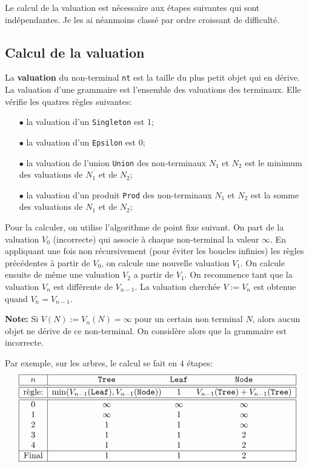 \documentclass[11pt]{article}
\renewcommand{\emph}[1]{\textbf{#1}}
\begin{document}
Le calcul de la valuation est nécessaire aux étapes suivantes qui sont
indépendantes. Je les ai néanmoins classé par ordre croissant de difficulté.

\subsection{Calcul de la valuation}

La \emph{valuation} du non-terminal \texttt{nt} est la taille du plus petit
objet qui en dérive. La valuation d'une grammaire est l'ensemble des
valuations des terminaux. Elle vérifie les quatres règles suivantes:
\begin{itemize}
\item[$\bullet$] la valuation d'un \texttt{Singleton} est 1;
\item[$\bullet$] la valuation d'un \texttt{Epsilon} est 0;
\item[$\bullet$] la valuation de l'union \texttt{Union} des non-terminaux
  $N_1$ et $N_2$ est le minimum des valuations de $N_1$ et de $N_2$;
\item[$\bullet$] la valuation d'un produit \texttt{Prod} des non-terminaux $N_1$
  et $N_2$ est la somme des valuations de $N_1$ et de $N_2$;
\end{itemize}

Pour la calculer, on utilise l'algorithme de point fixe suivant. On part de la
valuation $V_0$ (incorrecte) qui associe à chaque non-terminal la valeur
$\infty$. En appliquant une fois non récursivement (pour éviter les boucles
infinies) les règles précédentes à partir de $V_0$, on calcule une nouvelle
valuation $V_1$.  On calcule ensuite de même une valuation $V_2$ a partir de
$V_1$. On recommence tant que la valuation $V_n$ est différente de
$V_{n-1}$. La valuation cherchée $V := V_n$ est obtenue quand $V_n=V_{n-1}$.
\bigskip

\noindent\textbf{Note:} Si $V(N) := V_n(N) = \infty$ pour un certain non terminal
$N$, alors aucun objet ne dérive de ce non-terminal. On considère alors que la
grammaire est incorrecte.  \bigskip

Par exemple, sur les arbres, le calcul se fait en $4$ étapes:
$$\begin{array}{|c|ccc|}
\hline
  n     &  \texttt{Tree}  &  \texttt{Leaf}  &  \texttt{Node} \\
\hline\hline
  \text{règle:} & \min(V_{n-1}(\texttt{Leaf}),V_{n-1}(\texttt{Node}))
               & 1
               & V_{n-1}(\texttt{Tree}) + V_{n-1}(\texttt{Tree}) \\
\hline\hline
  0     &  \infty         &  \infty         &  \infty        \\
  1     &  \infty         &  1              &  \infty        \\
  2     &  1              &  1              &  \infty        \\
  3     &  1              &  1              &  2             \\
  4     &  1              &  1              &  2             \\
\hline
 \text{Final} &  1              &  1              &  2             \\
\hline
\end{array}$$
\end{document}
